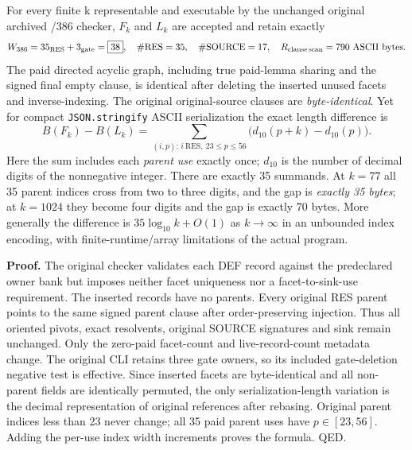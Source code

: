 \documentclass[11pt]{article}
\begin{document}
{For every finite k representable and executable by the unchanged original archived /386 checker, $F_k$ and $L_k$ are accepted and retain exactly
\[
 W_{386}=35_{\rm RES}+3_{\rm gate}=\boxed{38},\quad
 \#\mathrm{RES}=35,\quad \#\mathrm{SOURCE}=17,\quad
 R_{\rm clause\,scan}=790\ \mathrm{ASCII\ bytes}.
\]
The paid directed acyclic graph, including true paid-lemma sharing and the signed final empty clause, is identical after deleting the inserted unused facets and inverse-indexing. The original original-source clauses are \emph{byte-identical}. Yet for compact \texttt{JSON.stringify} ASCII serialization the exact length difference is
\[
 \boxed{B(F_k)-B(L_k)=\sum_{(i,p):\,i\ \mathrm{RES},\ 23\le p\le56}
 \bigl(d_{10}(p+k)-d_{10}(p)\bigr)}.
\]
Here the sum includes each \emph{parent use} exactly once; $d_{10}$ is the number of decimal digits of the nonnegative integer. There are exactly 35 summands. At $k=77$ all 35 parent indices cross from two to three digits, and the gap is \emph{exactly 35 bytes}; at $k=1024$ they become four digits and the gap is exactly 70 bytes. More generally the difference is $35\log_{10}k+O(1)$ as $k\to\infty$ in an unbounded index encoding, with finite-runtime/array limitations of the actual program.

\noindent\textbf{Proof.} The original checker validates each DEF record against the predeclared owner bank but imposes neither facet uniqueness nor a facet-to-sink-use requirement. The inserted records have no parents. Every original RES parent points to the same signed parent clause after order-preserving injection. Thus all oriented pivots, exact resolvents, original SOURCE signatures and sink remain unchanged. Only the zero-paid facet-count and live-record-count metadata change. The original CLI retains three gate owners, so its included gate-deletion negative test is effective. Since inserted facets are byte-identical and all non-parent fields are identically permuted, the only serialization-length variation is the decimal representation of original references after rebasing. Original parent indices less than 23 never change; all 35 paid parent uses have $p\in[23,56]$. Adding the per-use index width increments proves the formula. QED.

}
\end{document}
